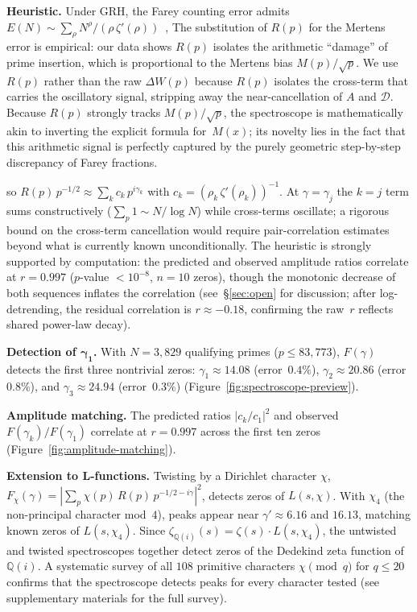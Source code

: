 \documentclass[11pt]{article}
\theoremstyle{definition}
\newcommand{\Q}{\mathbb{Q}}
\begin{document}
\noindent\textbf{Heuristic.}\quad
Under GRH, the Farey counting error admits
$E(N) \sim \sum_\rho N^\rho/(\rho\,\zeta'(\rho))$~\cite{Edwards1974},
The substitution of $R(p)$ for the Mertens error is empirical:
our data shows $R(p)$ isolates the arithmetic ``damage'' of prime
insertion, which is proportional to the Mertens bias $M(p)/\sqrt{p}$.
We use $R(p)$ rather than the raw $\Delta W(p)$ because
$R(p)$ isolates the cross-term that carries the oscillatory
signal, stripping away the near-cancellation of $A$ and $\mathcal{D}$.
Because $R(p)$ strongly tracks $M(p)/\sqrt{p}$,
the spectroscope is mathematically akin to inverting the
explicit formula for~$M(x)$; its novelty lies in the fact
that this arithmetic signal is perfectly captured by the
purely geometric step-by-step discrepancy of Farey fractions.

so $R(p)\,p^{-1/2}\approx\sum_k c_k\,p^{i\gamma_k}$
with $c_k = (\rho_k\,\zeta'(\rho_k))^{-1}$.
At $\gamma = \gamma_j$ the $k{=}j$ term sums constructively
($\sum_p 1 \sim N/\log N$) while cross-terms
oscillate; a rigorous bound on the cross-term cancellation
would require pair-correlation estimates beyond what
is currently known unconditionally.
The heuristic is strongly supported by computation:
the predicted and observed amplitude ratios correlate at
$r = 0.997$ ($p$-value $< 10^{-8}$, $n = 10$ zeros), though the
monotonic decrease of both sequences inflates the
correlation (see~\S\ref{sec:open} for discussion;
after log-detrending, the residual correlation is
$r \approx -0.18$, confirming the raw~$r$ reflects shared
power-law decay).

\noindent\textbf{Detection of $\boldsymbol{\gamma_1}$.}\quad
With $N=3{,}829$ qualifying primes ($p\le83{,}773$),
$F(\gamma)$ detects the first three nontrivial zeros:
$\gamma_1\approx 14.08$ (error~$0.4\%$),
$\gamma_2\approx 20.86$ (error~$0.8\%$), and
$\gamma_3\approx 24.94$ (error~$0.3\%$)
(Figure~\ref{fig:spectroscope-preview}).

\smallskip\noindent\textbf{Amplitude matching.}\quad
The predicted ratios $|c_k/c_1|^2$ and observed
$F(\gamma_k)/F(\gamma_1)$ correlate at $r = 0.997$
across the first ten zeros
(Figure~\ref{fig:amplitude-matching}).

\smallskip\noindent\textbf{Extension to $\boldsymbol{L}$-functions.}\quad
Twisting by a Dirichlet character $\chi$,
$F_\chi(\gamma)=|\sum_p \chi(p)\,R(p)\,p^{-1/2-i\gamma}|^2$,
detects zeros of $L(s,\chi)$.  With $\chi_4$
(the non-principal character mod~$4$), peaks appear near
$\gamma'\approx 6.16$ and $16.13$, matching known zeros
of $L(s,\chi_4)$.  Since $\zeta_{\Q(i)}(s) = \zeta(s)\cdot L(s,\chi_4)$,
the untwisted and twisted spectroscopes together detect
zeros of the Dedekind zeta function of $\Q(i)$.
A systematic survey of all $108$ primitive characters
$\chi\!\pmod{q}$ for $q \le 20$ confirms that the
spectroscope detects peaks for every character tested
(see supplementary materials for the full survey).
\end{document}

